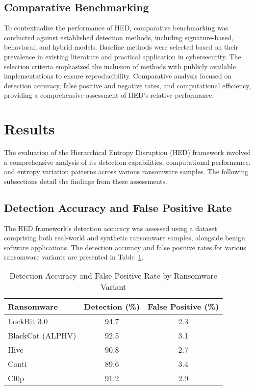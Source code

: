\documentclass[lettersize,journal]{IEEEtran}
\begin{document}
\subsection{Comparative Benchmarking}

To contextualize the performance of HED, comparative benchmarking was conducted against established detection methods, including signature-based, behavioral, and hybrid models. Baseline methods were selected based on their prevalence in existing literature and practical application in cybersecurity. The selection criteria emphasized the inclusion of methods with publicly available implementations to ensure reproducibility. Comparative analysis focused on detection accuracy, false positive and negative rates, and computational efficiency, providing a comprehensive assessment of HED's relative performance.



\section{Results}

The evaluation of the Hierarchical Entropy Disruption (HED) framework involved a comprehensive analysis of its detection capabilities, computational performance, and entropy variation patterns across various ransomware samples. The following subsections detail the findings from these assessments.

\subsection{Detection Accuracy and False Positive Rate}

The HED framework's detection accuracy was assessed using a dataset comprising both real-world and synthetic ransomware samples, alongside benign software applications. The detection accuracy and false positive rates for various ransomware variants are presented in Table~\ref{tab:detection_accuracy}.

\begin{table}[h]
	\centering
	\caption{Detection Accuracy and False Positive Rate by Ransomware Variant}
	\label{tab:detection_accuracy}
	\begin{tabular}{|l|c|c|}
		\hline
		\textbf{Ransomware} & \textbf{Detection (\%)} & \textbf{False Positive (\%)} \\
		\hline
		LockBit 3.0 & 94.7 & 2.3 \\
		BlackCat (ALPHV) & 92.5 & 3.1 \\
		Hive & 90.8 & 2.7 \\
		Conti & 89.6 & 3.4 \\
		Cl0p & 91.2 & 2.9 \\
		\hline
	\end{tabular}
\end{table}
\end{document}
